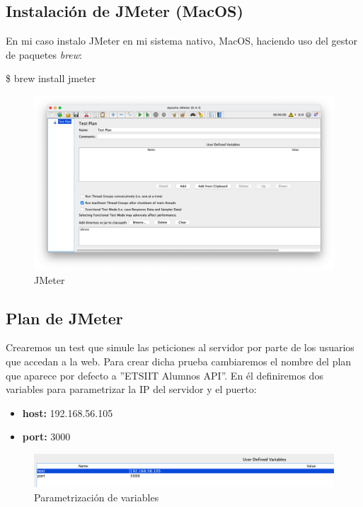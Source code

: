 \subsection{Instalación de JMeter (MacOS)}
En mi caso instalo JMeter en mi sistema nativo, MacOS, haciendo uso del gestor de paquetes \emph{brew}:
\begin{tcolorbox}[colback=black!10, halign=left]
    \$ brew install jmeter
\end{tcolorbox}

\begin{figure}[H]
    \centering
    \includegraphics[scale=0.33]{images/jmeter.png}
    \caption{JMeter}
    \label{fig:jmeter}
\end{figure}

\subsection{Plan de JMeter}
Crearemos un test que simule las peticiones al servidor por parte de los usuarios que accedan a la web. Para crear dicha prueba cambiaremos el nombre del plan que aparece
por defecto a ''ETSIIT Alumnos API''. En él definiremos dos variables para parametrizar la IP del servidor y el puerto:
\begin{itemize}
    \item \textbf{host:} 192.168.56.105
    \item \textbf{port:} 3000
\end{itemize}

\begin{figure}[H]
    \centering
    \includegraphics[scale=0.45]{images/variables.png}
    \caption{Parametrización de variables}
    \label{fig:variables}
\end{figure}

